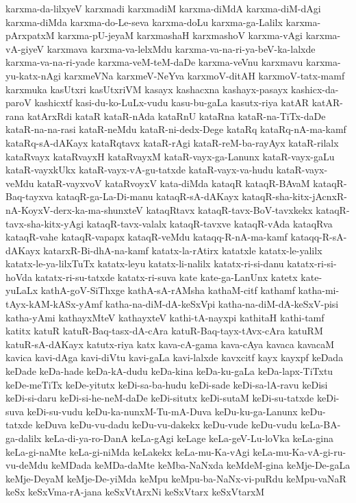 {karxma-da-lilxyeV
karxmadi
karxmadiM
karxma-diMdA
karxma-diM-dAgi
karxma-diMda
karxma-do-Le-seva
karxma-doLu
karxma-ga-Lalilx
karxma-pArxpatxM
karxma-pU-jeyaM
karxmashaH
karxmashoV
karxma-vAgi
karxma-vA-giyeV
karxmava
karxma-va-lelxMdu
karxma-va-na-ri-ya-beV-ka-lalxde
karxma-va-na-ri-yade
karxma-veM-teM-daDe
karxma-veVnu
karxmavu
karxma-yu-katx-nAgi
karxmeVNa
karxmeV-NeYva
karxmoV-ditAH
karxmoV-tatx-mamf
karxmuka
kasUtxri
kasUtxriVM
kasayx
kashacxna
kashayx-pasayx
kashicx-da-paroV
kashicxtf
kasi-du-ko-LuLx-vudu
kasu-bu-gaLa
kasutx-riya
katAR
katAR-rana
katArxRdi
kataR
kataR-nAda
kataRnU
kataRna
kataR-na-TiTx-daDe
kataR-na-na-rasi
kataR-neMdu
kataR-ni-dedx-Dege
kataRq
kataRq-nA-ma-kamf
kataRq-sA-dAKayx
kataRqtavx
kataR-rAgi
kataR-reM-ba-rayAyx
kataR-rilalx
kataRvayx
kataRvayxH
kataRvayxM
kataR-vayx-ga-Lanunx
kataR-vayx-gaLu
kataR-vayxkUkx
kataR-vayx-vA-gu-tatxde
kataR-vayx-va-hudu
kataR-vayx-veMdu
kataR-vayxvoV
kataRvoyxV
kata-diMda
kataqR
kataqR-BAvaM
kataqR-Baq-tayxva
kataqR-ga-La-Di-manu
kataqR-sA-dAKayx
kataqR-sha-kitx-jAcnxR-nA-KoyxV-derx-ka-ma-shunxteV
kataqRtavx
kataqR-tavx-BoV-tavxkekx
kataqR-tavx-sha-kitx-yAgi
kataqR-tavx-valalx
kataqR-tavxve
kataqR-vAda
kataqRva
kataqR-vahe
kataqR-vapapx
kataqR-veMdu
kataqq-R-nA-ma-kamf
kataqq-R-sA-dAKayx
katarxR-Bi-dhA-na-kamf
katatx-la-rAtirx
katatxle
katatx-le-yalilx
katatx-le-ya-lilxTuTx
katatx-leyu
katatx-li-nalilx
katatx-ri-si-danu
katatx-ri-si-hoVda
katatx-ri-su-tatxde
katatx-ri-suva
kate
kate-ga-LanUnx
katetx
kate-yuLaLx
kathA-goV-SiThxge
kathA-sA-rAMsha
kathaM-citf
kathamf
katha-mi-tAyx-kAM-kASx-yAmf
katha-na-diM-dA-keSxVpi
katha-na-diM-dA-keSxV-pisi
katha-yAmi
kathayxMteV
kathayxteV
kathi-tA-nayxpi
kathitaH
kathi-tamf
katitx
katuR
katuR-Baq-tasx-dA-cAra
katuR-Baq-tayx-tAvx-cAra
katuRM
katuR-sA-dAKayx
katutx-riya
katx
kava-cA-gama
kava-cAya
kavaca
kavacaM
kavica
kavi-dAga
kavi-diVtu
kavi-gaLa
kavi-lalxde
kavxcitf
kayx
kayxpf
keDada
keDade
keDa-hade
keDa-kA-dudu
keDa-kina
keDa-ku-gaLa
keDa-lapx-TiTxtu
keDe-meTiTx
keDe-yitutx
keDi-sa-ba-hudu
keDi-sade
keDi-sa-lA-ravu
keDisi
keDi-si-daru
keDi-si-he-neM-daDe
keDi-situtx
keDi-sutaM
keDi-su-tatxde
keDi-suva
keDi-su-vudu
keDu-ka-nunxM-Tu-mA-Duva
keDu-ku-ga-Lanunx
keDu-tatxde
keDuva
keDu-vu-dadu
keDu-vu-dakekx
keDu-vude
keDu-vudu
keLa-BA-ga-dalilx
keLa-di-ya-ro-DanA
keLa-gAgi
keLage
keLa-geV-Lu-loVka
keLa-gina
keLa-gi-naMte
keLa-gi-niMda
keLakekx
keLa-mu-Ka-vAgi
keLa-mu-Ka-vA-gi-ru-vu-deMdu
keMDada
keMDa-daMte
keMba-NaNxda
keMdeM-gina
keMje-De-gaLa
keMje-DeyaM
keMje-De-yiMda
keMpu
keMpu-ba-NaNx-vi-puRdu
keMpu-vaNaR
keSx
keSxVma-rA-jana
keSxVtArxNi
keSxVtarx
keSxVtarxM
}
